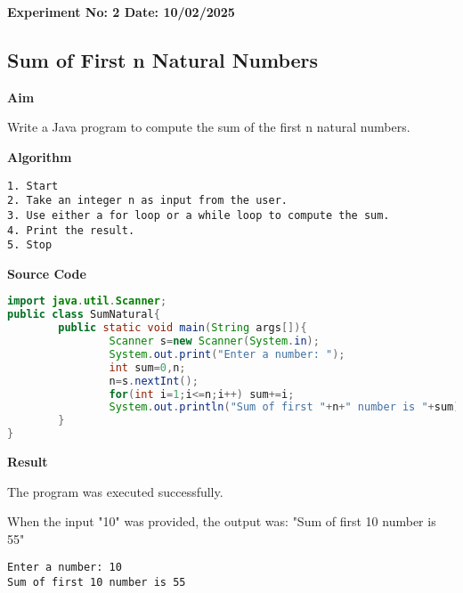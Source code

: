 \textbf{Experiment No: 2 \hfill Date: 10/02/2025}

\begin{center}
    \Large \subsection*{Sum of First n Natural Numbers}
\end{center}

\textbf{Aim}
\vspace{0.5cm}

Write a Java program to compute the sum of the first n natural numbers.

\vspace{0.5cm}
\textbf{Algorithm}
\vspace{0.5cm}
\begin{verbatim}
1. Start
2. Take an integer n as input from the user.
3. Use either a for loop or a while loop to compute the sum.
4. Print the result.
5. Stop
\end{verbatim}

\vspace{0.5cm}
\textbf{Source Code}
\begin{lstlisting}[language=Java]
import java.util.Scanner;
public class SumNatural{
        public static void main(String args[]){
                Scanner s=new Scanner(System.in);
                System.out.print("Enter a number: ");
                int sum=0,n;
                n=s.nextInt();
                for(int i=1;i<=n;i++) sum+=i;
                System.out.println("Sum of first "+n+" number is "+sum);
        }
}
\end{lstlisting}

\vspace{0.5cm}
\textbf{Result}
\vspace{0.5cm}

The program was executed successfully. 

When the input "10" was provided, the output was: "Sum of first 10 number is 55"
\begin{verbatim}
Enter a number: 10
Sum of first 10 number is 55
\end{verbatim}

